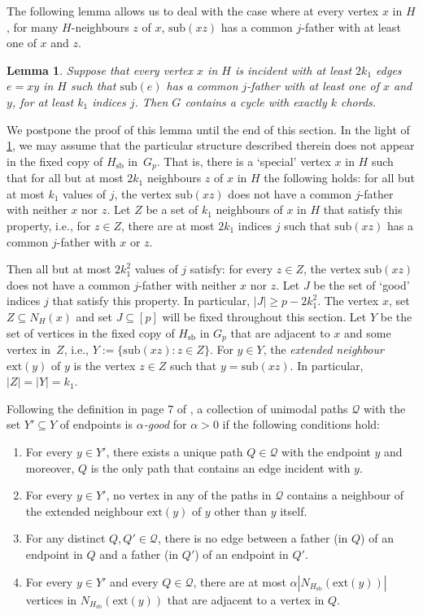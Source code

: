 \documentclass[11pt,english]{article}
\theoremstyle{plain}
\newtheorem{lem}[thm]{Lemma}
\theoremstyle{definition}
\theoremstyle{remark}
\newcommand{\Q}{\mathcal{Q}}
\newcommand{\sub}{\mathrm{sub}}
\newcommand{\sbb}{\mathrm{sb}}
\newcommand{\ext}{\mathrm{ext}}
\begin{document}
    The following lemma allows us to deal with the case where at every vertex $x$ in $H$, for many $H$-neighbours $z$ of $x$, $\sub(xz)$ has a common $j$-father with at least one of $x$ and $z$. 

	\begin{lem} \label{lem:all-x-bad}
		Suppose that every vertex $x$ in $H$ is incident with at least $2k_1$ edges $e = xy$ in $H$ such that $\sub(e)$ has a common $j$-father with at least one of $x$ and $y$, for at least $k_1$ indices $j$.
		Then $G$ contains a cycle with exactly $k$ chords.
	\end{lem}  
	We postpone the proof of this lemma until the end of this section.
	In the light of \cref{lem:all-x-bad}, we may assume that the particular structure described therein does not appear in the fixed copy of $H_\sbb$ in~$G_p$.
	That is, there is a `special' vertex $x$ in $H$ such that for all but at most $2k_1$ neighbours $z$ of $x$ in $H$ the following holds: for all but at most $k_1$ values of $j$, the vertex $\sub(xz)$ does not have a common $j$-father with neither $x$ nor $z$. 
	Let $Z$ be a set of $k_1$ neighbours of $x$ in $H$ that satisfy this property, i.e., for $z\in Z$, there are at most $2k_1$ indices $j$ such that $\sub(xz)$ has a common $j$-father with $x$ or $z$.
	
	Then all but at most $2k_1^2$ values of $j$ satisfy: for every $z \in Z$, the vertex $\sub(xz)$ does not have a common $j$-father with neither $x$ nor $z$.
	Let $J$ be the set of `good' indices $j$ that satisfy this property. In particular, $|J| \ge p - 2k_1^2$. The vertex $x$, set $Z \subseteq N_H(x)$ and set $J \subseteq [p]$ will be fixed throughout this section. Let $Y$ be the set of vertices in the fixed copy of $H_\sbb$ in $G_p$ that are adjacent to $x$ and some vertex in~$Z$, i.e., $Y := \{\sub(xz) : z \in Z\}$. 
	For $y\in Y$, the \emph{extended neighbour} $\ext(y)$ of $y$ is the vertex $z\in Z$ such that $y=\sub(xz)$.
	In particular, $|Z|=|Y|=k_1$.
    
    Following the definition in page 7 of \cite{bousquet-thomasse}, a collection of unimodal paths $\Q$ with the set $Y' \subseteq Y$ of endpoints is \emph{$\alpha$-good} for $\alpha>0$ if the following conditions hold:
    \begin{enumerate} [label = \rm(G\arabic*)]
        \item
            For every $y \in Y'$, there exists a unique path $Q\in\Q$ with the endpoint $y$ and moreover, $Q$ is the only path that contains an edge incident with $y$.
        \item
            For every $y \in Y'$, no vertex in any of the paths in $\Q$ contains a neighbour of the extended neighbour $\ext(y)$ of $y$ other than $y$ itself.
        \item
            For any distinct $Q, Q' \in \Q$, there is no edge between a father (in $Q$) of an endpoint in $Q$ and a father (in $Q'$) of an endpoint in $Q'$.
        \item
            For every $y \in Y'$ and every $Q \in \Q$, there are at most $\alpha|N_{H_\sbb}(\ext(y))|$ vertices in $N_{H_\sbb}(\ext(y))$ that are adjacent to a vertex in $Q$.
    \end{enumerate}
\end{document}
